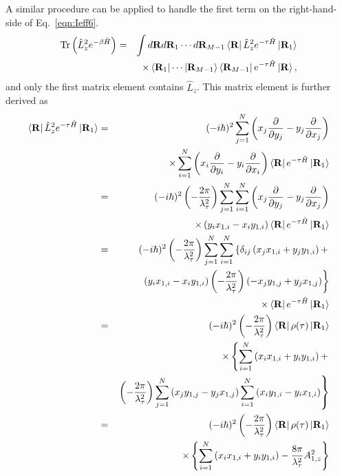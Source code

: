 \documentclass[12pt]{iopart}
\begin{document}
A similar procedure can be applied to handle the first term on the right-hand-side of Eq.~\ref{eqn:Ieff6}.
\begin{eqnarray}
{\rm Tr}\left(\hat{L}_z^2e^{-\beta\hat{H}} \right)&=&\int d{\bf R} d{\bf R}_1\cdots d{\bf R}_{M-1}\left<{\bf R}\right|\hat{L}_z^2e^{-\tau\hat{H}}\left|{\bf R}_1\right>\nonumber\\
&&\times\left<{\bf R}_1\right|\cdots\left|{\bf R}_{M-1}\right>\left<{\bf R}_{M-1}\right|e^{-\tau\hat{H}}\left|{\bf R}\right>,\end{eqnarray}
and only the first matrix element contains $\hat{L}_z$. This matrix element is further derived as
\begin{eqnarray}
\left<{\bf R}\right|\hat{L}_z^2e^{-\tau\hat{H}}\left|{\bf R}_1\right>&=&(-i\hbar)^2\sum_{j=1}^N\left( x_j\frac{\partial}{\partial y_j} - y_j\frac{\partial}{\partial x_j} \right)\nonumber\\
&&\times \sum_{i=1}^N\left( x_i\frac{\partial}{\partial y_i} - y_i\frac{\partial}{\partial x_i} \right)\left<{\bf R}\right|e^{-\tau\hat{H}}\left|{\bf R}_1\right>\nonumber\\
&=&(-i\hbar)^2\left(-\frac{2\pi}{\lambda_\tau^2} \right)\sum_{j=1}^N\sum_{i=1}^N\left( x_j\frac{\partial}{\partial y_j} - y_j\frac{\partial}{\partial x_j} \right)\nonumber\\
&&\times\left( y_ix_{1,i}-x_iy_{1,i} \right)\left<{\bf R}\right|e^{-\tau\hat{H}}\left|{\bf R}_1\right>\nonumber\\
&=&(-i\hbar)^2\left(-\frac{2\pi}{\lambda_\tau^2} \right)\sum_{j=1}^N\sum_{i=1}^N\left\{ \delta_{ij}\left(x_jx_{1,i}+y_jy_{1,i} \right)+\right.\nonumber\\
&&\left. \left( y_ix_{1,i}-x_iy_{1,i} \right)\left( -\frac{2\pi}{\lambda_\tau^2}\right)\left(-x_jy_{1,j}+y_jx_{1,j} \right) \right\}\nonumber\\
&&\times\left<{\bf R}\right|e^{-\tau\hat{H}}\left|{\bf R}_1\right>\nonumber\\
&=&(-i\hbar)^2\left(-\frac{2\pi}{\lambda_\tau^2} \right)\left<{\bf R}\right|\rho(\tau)\left|{\bf R}_1\right>\nonumber\\
&&\times \left\{\sum_{i=1}^N \left(x_ix_{1,i}+y_iy_{1,i} \right)+ \right.\nonumber\\
&&\left.\left(-\frac{2\pi}{\lambda_\tau^2}\right)\sum_{j=1}^N\left(x_jy_{1,j}-y_jx_{1,j} \right)\sum_{i=1}^N\left(x_iy_{1,i}-y_ix_{1,i} \right)\right\}\nonumber\\
&=&(-i\hbar)^2\left(-\frac{2\pi}{\lambda_\tau^2} \right)\left<{\bf R}\right|\rho(\tau)\left|{\bf R}_1\right>\nonumber\\
&&\times\left\{ \sum_{i=1}^N \left(x_ix_{1,i}+y_iy_{1,i} \right)-\frac{8\pi}{\lambda_\tau^2}A_{1,z}^2 \right\}
\end{eqnarray}
\end{document}
